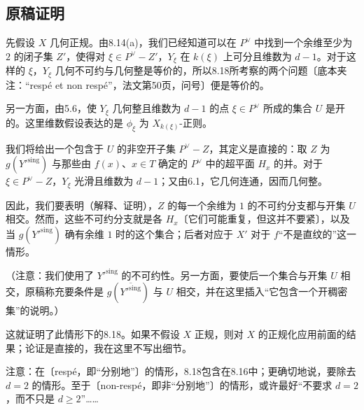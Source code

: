 \subsection*{原稿证明}
先假设 $X$ 几何正规。由8.14(a)，我们已经知道可以在 $P^\vee$ 中找到一个余维至少为 $2$ 的闭子集 $Z'$，使得对 $\xi\in P^\vee-Z'$，$Y_\xi$ 在 $k(\xi)$ 上可分且维数为 $d-1$。对于这样的 $\xi$，$Y_\xi$ 几何不可约与几何整是等价的，所以8.18所考察的两个问题〔底本夹注：“respé et non respé”，法文第50页，问号〕便是等价的。

另一方面，由5.6，使 $Y_\xi$ 几何整且维数为 $d-1$ 的点 $\xi\in P^\vee$ 所成的集合 $U$ 是开的。这里维数假设表达的是 $\phi_\xi$ 为 $X_{k(\xi)}$-正则。

我们将给出一个包含于 $U$ 的非空开子集 $P^\vee-Z$，其定义是直接的：取 $Z$ 为 $g(Y'^{\mathrm{sing}})$ 与那些由 $f(x)$、$x\in T$ 确定的 $P^\vee$ 中的超平面 $H_x$ 的并。对于 $\xi\in P^\vee-Z$，$Y_\xi$ 光滑且维数为 $d-1$；又由6.1，它几何连通，因而几何整。

因此，我们要表明（解释、证明），$Z$ 的每一个余维为 $1$ 的不可约分支都与开集 $U$ 相交。然而，这些不可约分支就是各 $H_x$〔它们可能重复，但这并不要紧〕，以及当 $g(Y'^{\mathrm{sing}})$ 确有余维 $1$ 时的这个集合；后者对应于 $X'$ 对于 $f$“不是直纹的”这一情形。

（注意：我们使用了 $Y'^{\mathrm{sing}}$ 的不可约性。另一方面，要使后一个集合与开集 $U$ 相交，原稿称充要条件是 $g(\overline{Y'^{\mathrm{sing}}})$ 与 $U$ 相交，并在这里插入“它包含一个开稠密集”的说明。）

这就证明了此情形下的8.18。如果不假设 $X$ 正规，则对 $X$ 的正规化应用前面的结果；论证是直接的，我在这里不写出细节。

注意：在〔respé，即“分别地”〕的情形，8.18包含在8.16中；更确切地说，要除去 $d=2$ 的情形。至于〔non-respé，即非“分别地”〕的情形，或许最好“不要求 $d=2$，而不只是 $d\ge2$”……

